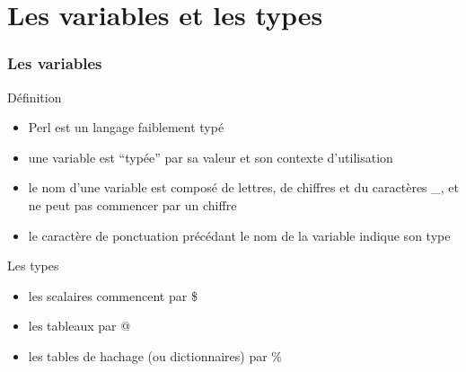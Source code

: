 \section{Les variables et les types}

\begin{frame}[fragile]
  \frametitle{Les variables}

  \begin{block}{Définition}
    \begin{itemize}
      \item Perl est un langage faiblement typé
      \item une variable est ``typée'' par sa valeur et son contexte
        d'utilisation
      \item le nom d'une variable est composé de lettres, de chiffres et du
        caractères \_, et ne peut pas commencer par un chiffre
      \item le caractère de ponctuation précédant le nom de la variable
        indique son type
    \end{itemize}
  \end{block}

  \begin{exampleblock}{Les types}
    \begin{itemize}
    \item les scalaires commencent par \$
    \item les tableaux par @
    \item les tables de hachage (ou dictionnaires) par \%
    \end{itemize}
  \end{exampleblock}

\end{frame}

